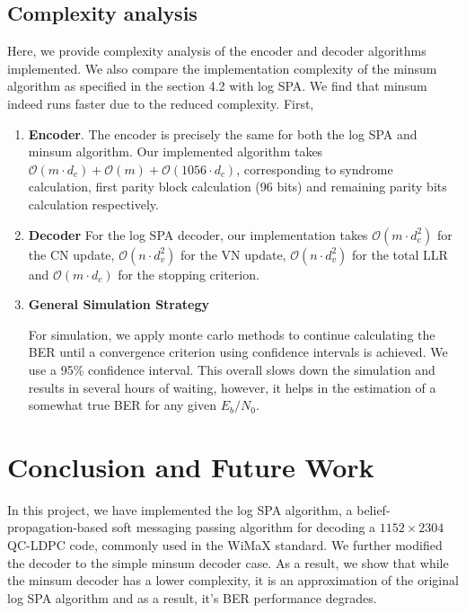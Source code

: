 \documentclass[12pt]{scrreprt}
\begin{document}
	
	\section{Complexity analysis}
	Here, we provide complexity analysis of the encoder and decoder algorithms implemented. We also compare the implementation complexity of the minsum algorithm as specified in the section 4.2 with log SPA. We find that minsum indeed runs faster due to the reduced complexity. First,
	
	\begin{enumerate}
		\item \textbf{Encoder}. The encoder is precisely the same for both the log SPA and minsum algorithm. Our implemented algorithm takes $\mathcal{O} (m \cdot d_c) +  \mathcal{O} (m) + \mathcal{O} (1056 \cdot d_c)$, corresponding to syndrome calculation, first parity block calculation (96 bits) and remaining parity bits calculation respectively. 
		
		\item \textbf{Decoder} For the log SPA decoder, our implementation takes $\mathcal{O} (m\cdot d_c^2)$ for the CN update, $\mathcal{O} (n\cdot d_v^2)$ for the VN update, $\mathcal{O} (n\cdot d_v^2)$ for the total LLR and $\mathcal{O} (m\cdot d_c)$ for the stopping criterion.
		
		\item \textbf{General Simulation Strategy}
		
		For simulation, we apply monte carlo methods to continue calculating the BER until a convergence criterion using confidence intervals is achieved. We use a 95\% confidence interval. This overall slows down the simulation and results in several hours of waiting, however, it helps in the estimation of a somewhat true BER for any given $E_b/N_0$. 
		
	\end{enumerate}
	
	\chapter{Conclusion and Future Work}
	In this project, we have implemented the log SPA algorithm, a belief-propagation-based soft messaging passing algorithm for decoding a $1152 \times 2304$ QC-LDPC code, commonly used in the WiMaX standard. We further modified the decoder to the simple minsum decoder case. As a result, we show that while the minsum decoder has a lower complexity, it is an approximation of the original log SPA algorithm and as a result, it's BER performance degrades. 
	
\end{document}
